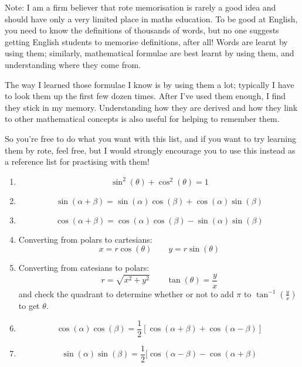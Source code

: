 \documentclass{article}
\begin{document}
Note: I am a firm believer that rote memorisation is rarely a good idea and should have only a very limited place in maths education. To be good at English, you need to know the definitions of thousands of words, but no one suggests getting English students to memorise definitions, after all! Words are learnt by using them; similarly, mathematical formulae are best learnt by using them, and understanding where they come from.

The way I learned those formulae I know is by using them a lot; typically I have to look them up the first few dozen times. After I've used them enough, I find they stick in my memory. Understanding how they are derived and how they link to other mathematical concepts is also useful for helping to remember them.

So you're free to do what you want with this list, and if you want to try learning them by rote, feel free, but I would strongly encourage you to use this instead as a reference list for practising with them!

\begin{enumerate}
\item \[\sin^2(\theta)+\cos^2(\theta)=1\]
\item \[\sin(\alpha+\beta)=\sin(\alpha)\cos(\beta)+\cos(\alpha)\sin(\beta)\]
\item \[\cos(\alpha+\beta)=\cos(\alpha)\cos(\beta)-\sin(\alpha)\sin(\beta)\]
\item Converting from polars to cartesians:
	\[x=r\cos(\theta)\qquad y=r\sin(\theta)\]
\item Converting from catesians to polars:
	\[r=\sqrt{x^2+y^2}\qquad \tan(\theta)=\frac{y}{x}\]
	and check the quadrant to determine whether or not to add $\pi$ to $\tan^{-1}\left(\frac{y}{x}\right)$ to get $\theta$.
\item \[\cos(\alpha)\cos(\beta)=\frac{1}{2}[\cos(\alpha+\beta)+\cos(\alpha-\beta)]\]
\item \[\sin(\alpha)\sin(\beta)=\frac{1}{2}[\cos(\alpha-\beta)-\cos(\alpha+\beta)\]
\end{enumerate}
\end{document}

